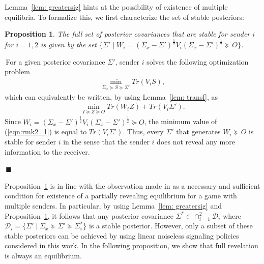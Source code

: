 \documentclass[12pt,journal,onecolumn]{IEEEtran}
\newtheorem{prop}{{Proposition}}
\newenvironment{Proof}[1]{\medskip\par\noindent{\bf Proof:\,}\,#1}{{\mbox{\,$\blacksquare$}\par}}
\begin{document}
Lemma~\ref{lem: greatersig} hints at the possibility of existence of multiple equilibria. To formalize this, we first characterize the set of stable posteriors:
\begin{prop}\label{Remark_2}
The full set of posterior covariances that are stable for sender $i$ for $i=1,2$ is given by the set $\{\Sigma'\mid W_i=(\Sigma_x-\Sigma')^{\frac{1}{2}}V_i(\Sigma_x-\Sigma')^{\frac{1}{2}}\succeq O\}$.
\end{prop}
\begin{Proof}
For a given posterior covariance $\Sigma'$, sender $i$ solves the following optimization problem
\begin{align} 
    \min_{\Sigma_x\succeq S\succeq \Sigma'} Tr(V_i S),
\end{align}
which can equivalently be written, by using Lemma~\ref{lem: transf}, as
\begin{align}\label{eqn:rmk2_1}
    \min_{I\succeq Z\succeq O} Tr(W_iZ)+ Tr(V_i\Sigma').
\end{align}
Since $W_i=(\Sigma_x-\Sigma')^{\frac{1}{2}}V_i(\Sigma_x-\Sigma')^{\frac{1}{2}}\succeq O$, the minimum value of (\ref{eqn:rmk2_1}) is equal to $Tr(V_i\Sigma')$. Thus, every $\Sigma'$ that generates $W_i\succeq O$ is stable for sender $i$ in the sense that the sender $i$ does not reveal any more information to the receiver.
\end{Proof}

Proposition~\ref{Remark_2} is in line with the observation made in \cite{tamura2018bayesian} as a necessary and sufficient condition for existence of a partially revealing equilibrium for a game with multiple senders. In particular, by using Lemma~\ref{lem: greatersig} and Proposition~\ref{Remark_2}, it follows that any posterior covariance $\Sigma^* \in \cap_{i=1}^2 \mathcal{D}_i$ where  $\mathcal{D}_i = \{\Sigma'\mid\Sigma_x\succeq\Sigma'\succeq \Sigma_i^*\}$ is a stable posterior. %
However, only a subset of these stable posteriors can be achieved by using linear noiseless signaling policies considered in this work. In the following proposition, we show that full revelation is always an equilibrium.
\end{document}
